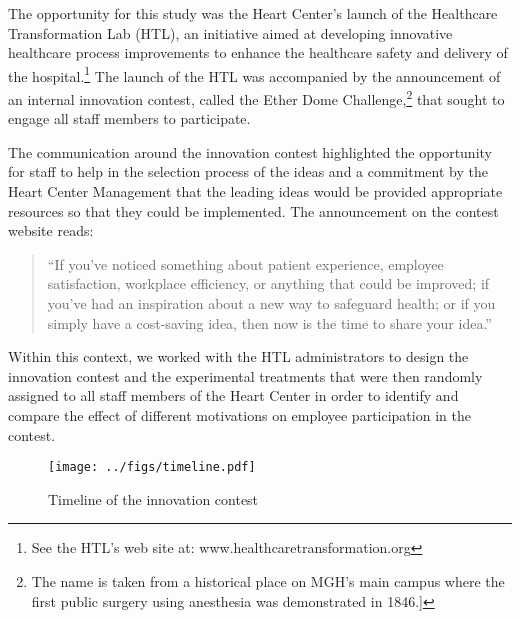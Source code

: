 \documentclass[11pt, titlepage]{article}
\begin{document}
The opportunity for this study was the Heart Center's launch of the
Healthcare Transformation Lab (HTL), an initiative aimed at developing
innovative healthcare process improvements to enhance the healthcare
safety and delivery of the hospital.\footnote{See the HTL's web site at:
  www.healthcaretransformation.org} The launch of the HTL was
accompanied by the announcement of an internal innovation contest,
called the Ether Dome Challenge,\footnote{The name is taken from a
  historical place on MGH's main campus where the first public surgery
  using anesthesia was demonstrated in 1846.{]}} that sought to engage
all staff members to participate.

The communication around the innovation contest highlighted the
opportunity for staff to help in the selection process of the ideas and
a commitment by the Heart Center Management that the leading ideas would
be provided appropriate resources so that they could be implemented. The
announcement on the contest website reads:

\begin{quote}
``If you've noticed something about patient experience, employee
satisfaction, workplace efficiency, or anything that could be improved;
if you've had an inspiration about a new way to safeguard health; or if
you simply have a cost-saving idea, then now is the time to share your
idea.''
\end{quote}

Within this context, we worked with the HTL administrators to design the
innovation contest and the experimental treatments that were then
randomly assigned to all staff members of the Heart Center in order to
identify and compare the effect of different motivations on employee
participation in the contest.

\begin{figure}
\centering
\caption{Timeline of the innovation contest}
\label{timeline}
\texttt{[image: ../figs/timeline.pdf]}
\end{figure}
\end{document}
